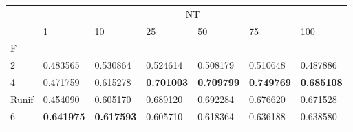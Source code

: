\begin{table}[htbp]
\centering
\label{nursery-results}
\begin{tabular}{lllllll}
\toprule
 & \multicolumn{6}{c}{NT} \\
 & 1 & 10 & 25 & 50 & 75 & 100 \\
F &  &  &  &  &  &  \\
\midrule
2 & 0.483565 & 0.530864 & 0.524614 & 0.508179 & 0.510648 & 0.487886 \\
4 & 0.471759 & 0.615278 & \textbf{0.701003} & \textbf{0.709799} & \textbf{0.749769} & \textbf{0.685108} \\
Runif & 0.454090 & 0.605170 & 0.689120 & 0.692284 & 0.676620 & 0.671528 \\
6 & \textbf{0.641975} & \textbf{0.617593} & 0.605710 & 0.618364 & 0.636188 & 0.638580 \\
\bottomrule
\end{tabular}
\end{table}
